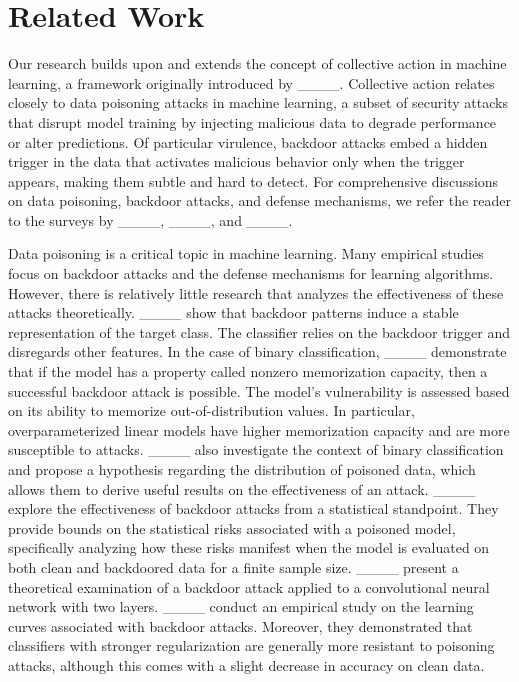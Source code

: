 \section{Related Work}
Our research builds upon and extends the concept of collective action in machine learning, a framework originally introduced by ____. Collective action relates closely to data poisoning attacks in machine learning, a subset of security attacks that disrupt model training by injecting malicious data to degrade performance or alter predictions. Of particular virulence, backdoor attacks embed a hidden trigger in the data that activates malicious behavior only when the trigger appears, making them subtle and hard to detect. For comprehensive discussions on data poisoning, backdoor attacks, and defense mechanisms, we refer the reader to the surveys by ____, ____, and ____.

Data poisoning is a critical topic in machine learning. Many empirical studies focus on backdoor attacks and the defense mechanisms for learning algorithms. However, there is relatively little research that analyzes the effectiveness of these attacks theoretically. ____ show that backdoor patterns induce a stable representation of the target class. The classifier relies on the backdoor trigger and disregards other features. In the case of binary classification, ____ demonstrate that if the model has a property called nonzero memorization capacity, then a successful backdoor attack is possible. The model's vulnerability is assessed based on its ability to memorize out-of-distribution values. In particular,  overparameterized
linear models have higher memorization capacity and are more susceptible to attacks. ____ also investigate the context of binary classification and propose a hypothesis regarding the distribution of poisoned data, which allows them to derive useful results on the effectiveness of an attack. ____ explore the effectiveness of backdoor attacks from a statistical standpoint. They provide bounds on the statistical risks associated with a poisoned model, specifically analyzing how these risks manifest when the model is evaluated on both clean and backdoored data for a finite sample size. ____ present a theoretical examination of a backdoor attack applied to a convolutional neural network with two layers. ____  conduct an empirical study on the learning curves associated with backdoor attacks. Moreover, they demonstrated that classifiers with stronger regularization are generally more resistant to poisoning attacks, although this comes with a slight decrease in accuracy on clean data. 


